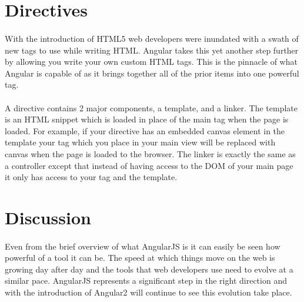 \documentclass[
10pt, %
a4paper, %
oneside, %
headinclude,footinclude, %
BCOR5mm, %
]{scrartcl}
\begin{document}
\section{Directives}
\paragraph{}
With the introduction of HTML5 web developers were inundated with a swath of new tags to use while writing HTML.
Angular takes this yet another step further by allowing you write your own custom HTML tags.
This is the pinnacle of what Angular is capable of as it brings together all of the prior items into one powerful tag.

\paragraph{}
A directive contains 2 major components, a template, and a linker.
The template is an HTML snippet which is loaded in place of the main tag when the page is loaded.
For example, if your directive has an embedded canvas element in the template your tag which you place in your main view will be replaced with canvas when the page is loaded to the browser.
The linker is exactly the same as a controller except that instead of having access to the DOM of your main page it only has access to your tag and the template. \cite{Kambona}

\section{Discussion}
\paragraph{}
Even from the brief overview of what AngularJS is it can easily be seen how powerful of a tool it can be.
The speed at which things move on the web is growing day after day and the tools that web developers use need to evolve at a similar pace.
AngularJS represents a significant step in the right direction and with the introduction of Angular2 will continue to see this evolution take place.


\newpage %

\renewcommand{\refname}{\spacedlowsmallcaps{References}} %




\end{document}
